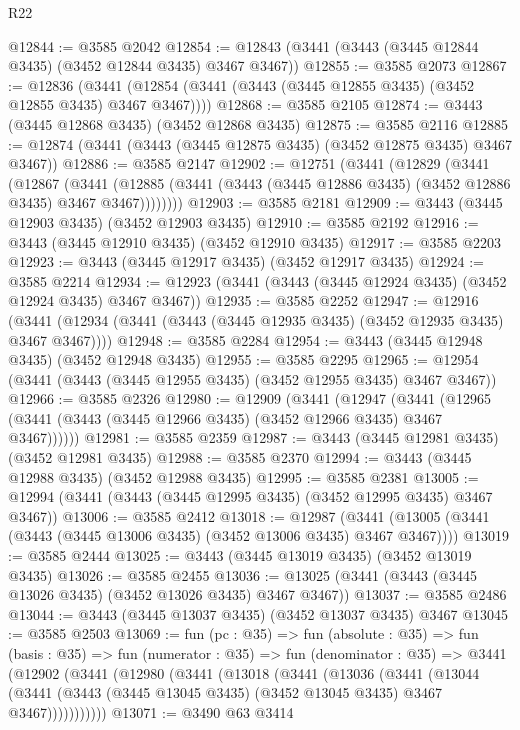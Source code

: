 \begin{lexlean}{R22}
\begin{coremodule}
@12844 := @3585 @2042
@12854 := @12843 (@3441 (@3443 (@3445 @12844 @3435) (@3452 @12844 @3435) @3467 @3467))
@12855 := @3585 @2073
@12867 := @12836
    (@3441 (@12854 (@3441 (@3443 (@3445 @12855 @3435) (@3452 @12855 @3435) @3467 @3467))))
@12868 := @3585 @2105
@12874 := @3443 (@3445 @12868 @3435) (@3452 @12868 @3435)
@12875 := @3585 @2116
@12885 := @12874 (@3441 (@3443 (@3445 @12875 @3435) (@3452 @12875 @3435) @3467 @3467))
@12886 := @3585 @2147
@12902 := @12751
    (@3441
      (@12829
        (@3441
          (@12867
            (@3441
              (@12885 (@3441 (@3443 (@3445 @12886 @3435) (@3452 @12886 @3435) @3467 @3467))))))))
@12903 := @3585 @2181
@12909 := @3443 (@3445 @12903 @3435) (@3452 @12903 @3435)
@12910 := @3585 @2192
@12916 := @3443 (@3445 @12910 @3435) (@3452 @12910 @3435)
@12917 := @3585 @2203
@12923 := @3443 (@3445 @12917 @3435) (@3452 @12917 @3435)
@12924 := @3585 @2214
@12934 := @12923 (@3441 (@3443 (@3445 @12924 @3435) (@3452 @12924 @3435) @3467 @3467))
@12935 := @3585 @2252
@12947 := @12916
    (@3441 (@12934 (@3441 (@3443 (@3445 @12935 @3435) (@3452 @12935 @3435) @3467 @3467))))
@12948 := @3585 @2284
@12954 := @3443 (@3445 @12948 @3435) (@3452 @12948 @3435)
@12955 := @3585 @2295
@12965 := @12954 (@3441 (@3443 (@3445 @12955 @3435) (@3452 @12955 @3435) @3467 @3467))
@12966 := @3585 @2326
@12980 := @12909
    (@3441
      (@12947
        (@3441 (@12965 (@3441 (@3443 (@3445 @12966 @3435) (@3452 @12966 @3435) @3467 @3467))))))
@12981 := @3585 @2359
@12987 := @3443 (@3445 @12981 @3435) (@3452 @12981 @3435)
@12988 := @3585 @2370
@12994 := @3443 (@3445 @12988 @3435) (@3452 @12988 @3435)
@12995 := @3585 @2381
@13005 := @12994 (@3441 (@3443 (@3445 @12995 @3435) (@3452 @12995 @3435) @3467 @3467))
@13006 := @3585 @2412
@13018 := @12987
    (@3441 (@13005 (@3441 (@3443 (@3445 @13006 @3435) (@3452 @13006 @3435) @3467 @3467))))
@13019 := @3585 @2444
@13025 := @3443 (@3445 @13019 @3435) (@3452 @13019 @3435)
@13026 := @3585 @2455
@13036 := @13025 (@3441 (@3443 (@3445 @13026 @3435) (@3452 @13026 @3435) @3467 @3467))
@13037 := @3585 @2486
@13044 := @3443 (@3445 @13037 @3435) (@3452 @13037 @3435) @3467
@13045 := @3585 @2503
@13069 := fun (pc : @35) =>
  fun (absolute : @35) =>
  fun (basis : @35) =>
  fun (numerator : @35) =>
  fun (denominator : @35) =>
  @3441
    (@12902
      (@3441
        (@12980
          (@3441
            (@13018
              (@3441
                (@13036
                  (@3441
                    (@13044
                      (@3441 (@3443 (@3445 @13045 @3435) (@3452 @13045 @3435) @3467 @3467)))))))))))
@13071 := @3490 @63 @3414

\end{coremodule}
\end{lexlean}
